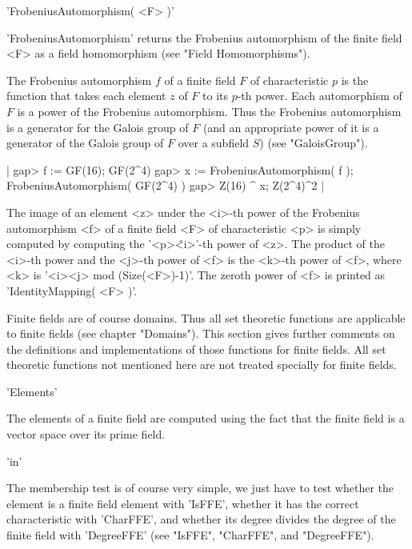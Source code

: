 'FrobeniusAutomorphism( <F> )'

'FrobeniusAutomorphism'  returns the Frobenius automorphism of the finite
field <F> as a field homomorphism (see "Field Homomorphisms").

The  Frobenius automorphism $f$ of  a finite field $F$  of characteristic
$p$  is  the function that  takes  each element $z$ of  $F$ to its $p$-th
power.    Each  automorphism  of  $F$  is  a   power   of  the  Frobenius
automorphism.  Thus the  Frobenius  automorphism  is a generator  for the
Galois group of $F$ (and an appropriate power of it is a generator of the
Galois group of $F$ over a subfield $S$) (see "GaloisGroup").

|    gap> f := GF(16);
    GF(2^4)
    gap> x := FrobeniusAutomorphism( f );
    FrobeniusAutomorphism( GF(2^4) )
    gap> Z(16) ^ x;
    Z(2^4)^2 |

The image  of an  element  <z> under the  <i>-th  power  of the Frobenius
automorphism  <f> of a finite field  <F> of characteristic <p> is  simply
computed by computing the '<p>\^<i>'-th power of <z>.  The product of the
<i>-th power and the <j>-th  power of <f> is  the  <k>-th power  of  <f>,
where <k> is  '<i>\*<j> mod (Size(<F>)-1)'.   The zeroth  power of <f> is
printed as 'IdentityMapping( <F> )'.

%
%
%

Finite  fields are of course domains.  Thus all  set theoretic  functions
are  applicable  to finite fields (see chapter "Domains").   This section
gives  further  comments on the definitions and  implementations of those
functions for finite fields.  All  set theoretic  functions not mentioned
here are not treated specially for finite fields.

'Elements'

The elements  of a  finite field  are computed  using the  fact that  the
finite field is a vector space over its prime field.

'in'

The membership test is  of course  very simple,  we  just  have  to  test
whether the  element is a  finite field element with 'IsFFE',  whether it
has the  correct characteristic  with 'CharFFE', and  whether its  degree
divides  the  degree of the  finite field  with 'DegreeFFE' (see "IsFFE",
"CharFFE", and "DegreeFFE").

